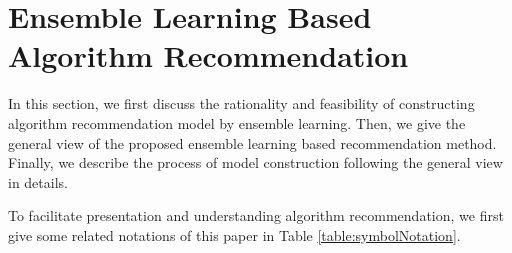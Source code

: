 \documentclass[prodmode,acmtkdd]{acmsmall}
\begin{document}







\section{Ensemble Learning Based Algorithm Recommendation}\label{sec:ensembleAlgRec}

In this section, we first discuss the rationality and feasibility of
constructing algorithm recommendation model by ensemble learning.
Then, we give the general view of the proposed ensemble learning
based recommendation method. Finally, we describe the process of
model construction following the general view in details.


To facilitate presentation and understanding algorithm
recommendation, we first give some related notations of this paper in Table \ref{table:symbolNotation}.
\end{document}
